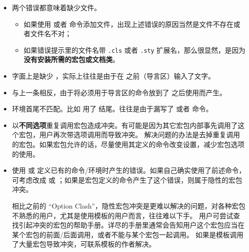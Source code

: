 \begin{itemize}
\item {}

两个错误都意味着缺少文件。
\begin{itemize}
  \item 如果使用  或者  命令添加文件，出现上述错误的原因当然是文件不存在或者文件名不对；
  \item 如果错误提示里的文件名带 \texttt{.cls} 或者 \texttt{.sty} 扩展名，那么很显然，是因为\textbf{没有安装所需的宏包或文档类}。
\end{itemize}

\item {}

字面上是缺少 ，实际上往往是由于在  之前（导言区）输入了文字。

\item {}

与上一条相反，由于将必须用于导言区的命令放到了  之后使用而产生。

\item {}

环境首尾不匹配。比如  用了  结尾。往往是由于漏写了 
或者  命令。

\item {}

以\textbf{不同选项}重复调用宏包造成冲突。有可能是因为其它宏包内部事先调用了这个宏包，用户再次带选项调用而导致冲突。
解决问题的办法是去掉重复调用的宏包。如果宏包允许的话，尽量使用其定义的命令改变设置，减少宏包选项的使用。

\item {}

使用  或  定义已有的命令/环境时产生的错误。如果自己确实使用了前述命令，可考虑改成
 或 ；如果是宏包定义的命令产生了这个错误，则属于隐性的宏包冲突。

相比之前的 ``Option Clash''，隐性宏包冲突是更难以解决的问题，对各种宏包不熟悉的用户，尤其是使用模板的用户而言，往往难以下手。
用户可尝试查找引起冲突的宏包的帮助手册。详尽的手册里通常会告知用户这个宏包应当在某个宏包的前面/后面调用，或者不能与某个宏包一起调用。
如果是模板调用了大量宏包导致冲突，可联系模板的作者解决。


\end{itemize}
